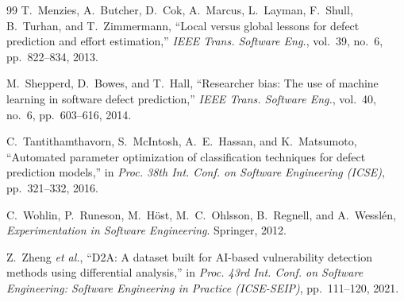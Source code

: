 \documentclass[12pt, oneside]{report}
\begin{document}
\begin{singlespace}
\begin{thebibliography}{99}
T.~Menzies, A.~Butcher, D.~Cok, A.~Marcus, L.~Layman, F.~Shull, B.~Turhan,
and T.~Zimmermann,
``Local versus global lessons for defect prediction and effort estimation,''
\textit{IEEE Trans. Software Eng.}, vol.~39, no.~6, pp.~822--834, 2013.

M.~Shepperd, D.~Bowes, and T.~Hall,
``Researcher bias: The use of machine learning in software defect prediction,''
\textit{IEEE Trans. Software Eng.}, vol.~40, no.~6, pp.~603--616, 2014.

C.~Tantithamthavorn, S.~McIntosh, A.~E.~Hassan, and K.~Matsumoto,
``Automated parameter optimization of classification techniques for defect prediction models,''
in \textit{Proc. 38th Int. Conf. on Software Engineering (ICSE)},
pp.~321--332, 2016.

C.~Wohlin, P.~Runeson, M.~H{\"o}st, M.~C.~Ohlsson, B.~Regnell, and A.~Wessl{\'e}n,
\textit{Experimentation in Software Engineering}.
Springer, 2012.

Z.~Zheng \textit{et al.},
``D2A: A dataset built for AI-based vulnerability detection methods using differential analysis,''
in \textit{Proc. 43rd Int. Conf. on Software Engineering: Software Engineering in Practice (ICSE-SEIP)},
pp.~111--120, 2021.

\end{thebibliography}
\end{singlespace}
\end{document}
